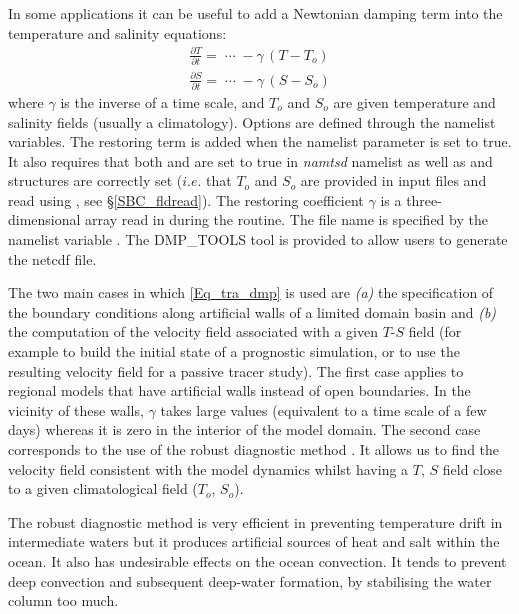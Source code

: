 In some applications it can be useful to add a Newtonian damping term 
into the temperature and salinity equations:
\begin{equation} \label{Eq_tra_dmp}
\begin{split}
 \frac{\partial T}{\partial t}=\;\cdots \;-\gamma \,\left( {T-T_o } \right)  \\
 \frac{\partial S}{\partial t}=\;\cdots \;-\gamma \,\left( {S-S_o } \right) 
 \end{split}
 \end{equation} 
where $\gamma$ is the inverse of a time scale, and $T_o$ and $S_o$ 
are given temperature and salinity fields (usually a climatology). 
Options are defined through the   namelist variables.
The restoring term is added when the namelist parameter  is set to true. 
It also requires that both  and  are set to true
in \textit{namtsd} namelist as well as  and  structures are 
correctly set  ($i.e.$ that $T_o$ and $S_o$ are provided in input files and read 
using , see \S\ref{SBC_fldread}). 
The restoring coefficient $\gamma$ is a three-dimensional array read in during the  routine. The file name is specified by the namelist variable . The DMP\_TOOLS tool is provided to allow users to generate the netcdf file.

The two main cases in which \eqref{Eq_tra_dmp} is used are \textit{(a)} 
the specification of the boundary conditions along artificial walls of a 
limited domain basin and \textit{(b)} the computation of the velocity 
field associated with a given $T$-$S$ field (for example to build the 
initial state of a prognostic simulation, or to use the resulting velocity 
field for a passive tracer study). The first case applies to regional 
models that have artificial walls instead of open boundaries. 
In the vicinity of these walls, $\gamma$ takes large values (equivalent to 
a time scale of a few days) whereas it is zero in the interior of the 
model domain. The second case corresponds to the use of the robust 
diagnostic method \citep{Sarmiento1982}. It allows us to find the velocity 
field consistent with the model dynamics whilst having a $T$, $S$ field 
close to a given climatological field ($T_o$, $S_o$). 

The robust diagnostic method is very efficient in preventing temperature 
drift in intermediate waters but it produces artificial sources of heat and salt 
within the ocean. It also has undesirable effects on the ocean convection. 
It tends to prevent deep convection and subsequent deep-water formation, 
by stabilising the water column too much.

